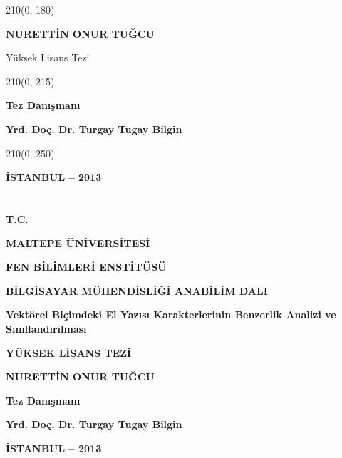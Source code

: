 \begin{titlepage}
\begin{textblock}{210}(0, 180)
	\centering
	
	\begin{large}	
		\textbf{NURETTİN ONUR TUĞCU}
		
		\vspace{\baselineskip}
		Yüksek Lisans Tezi
	\end{large}
\end{textblock}

\begin{textblock}{210}(0, 215)
	\centering
	
	\begin{large}	
		\textbf{Tez Danışmanı}
		
		\vspace{\baselineskip}
		\textbf{Yrd. Doç. Dr. Turgay Tugay Bilgin}
	\end{large}
\end{textblock}
\begin{textblock}{210}(0, 250)
	\centering
	
	\begin{large}	
		\textbf{İSTANBUL – 2013}
	\end{large}
\end{textblock}
\end{titlepage}
\section*{}
\clearpage

\section*{}
\clearpage

\begin{Large}
\centering
\textbf{T.C.}

\vspace{\baselineskip}
\textbf{MALTEPE ÜNİVERSİTESİ}

\vspace{\baselineskip}
\textbf{FEN BİLİMLERİ ENSTİTÜSÜ}

\vspace{\baselineskip}
\textbf{BİLGİSAYAR MÜHENDİSLİĞİ ANABİLİM DALI}

\vspace{\baselineskip}
\textbf{Vektörel Biçimdeki El Yazısı Karakterlerinin Benzerlik Analizi ve Sınıflandırılması}

\vspace{\baselineskip}
\textbf{YÜKSEK LİSANS TEZİ}

\vspace{\baselineskip}
\textbf{NURETTİN ONUR TUĞCU}

\vspace{\baselineskip}
\textbf{Tez Danışmanı}

\vspace{\baselineskip}
\textbf{Yrd. Doç. Dr. Turgay Tugay Bilgin}

\vspace{\baselineskip}
\textbf{İSTANBUL – 2013}

\end{Large}
\clearpage